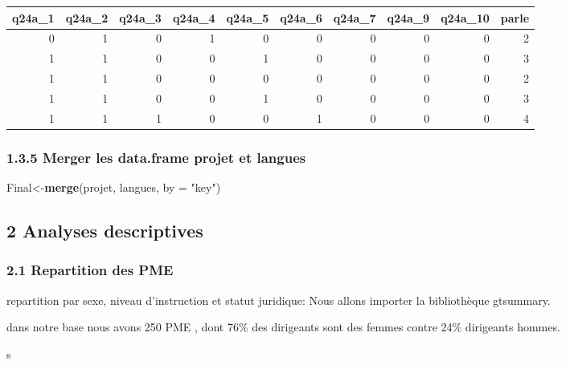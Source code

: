 \documentclass[
]{article}
\newenvironment{Shaded}{\begin{snugshade}}{\end{snugshade}}
\newcommand{\AttributeTok}[1]{\textcolor[rgb]{0.13,0.29,0.53}{#1}}
\newcommand{\FunctionTok}[1]{\textcolor[rgb]{0.13,0.29,0.53}{\textbf{#1}}}
\newcommand{\NormalTok}[1]{#1}
\newcommand{\OtherTok}[1]{\textcolor[rgb]{0.56,0.35,0.01}{#1}}
\newcommand{\StringTok}[1]{\textcolor[rgb]{0.31,0.60,0.02}{#1}}
\begin{document}
\begin{tabular}{r|r|r|r|r|r|r|r|r|r}
\hline
q24a\_1 & q24a\_2 & q24a\_3 & q24a\_4 & q24a\_5 & q24a\_6 & q24a\_7 & q24a\_9 & q24a\_10 & parle\\
\hline
0 & 1 & 0 & 1 & 0 & 0 & 0 & 0 & 0 & 2\\
\hline
1 & 1 & 0 & 0 & 1 & 0 & 0 & 0 & 0 & 3\\
\hline
1 & 1 & 0 & 0 & 0 & 0 & 0 & 0 & 0 & 2\\
\hline
1 & 1 & 0 & 0 & 1 & 0 & 0 & 0 & 0 & 3\\
\hline
1 & 1 & 1 & 0 & 0 & 1 & 0 & 0 & 0 & 4\\
\hline
\end{tabular}

\hypertarget{merger-les-data.frame-projet-et-langues}{%
\subsubsection{1.3.5 Merger les data.frame projet et
langues}\label{merger-les-data.frame-projet-et-langues}}

\begin{Shaded}
\begin{Highlighting}[]
\NormalTok{Final}\OtherTok{\textless{}{-}}\FunctionTok{merge}\NormalTok{(projet, langues, }\AttributeTok{by =} \StringTok{"key"}\NormalTok{)}
\end{Highlighting}
\end{Shaded}

\hypertarget{analyses-descriptives}{%
\subsection{2 Analyses descriptives}\label{analyses-descriptives}}

\hypertarget{repartition-des-pme}{%
\subsubsection{2.1 Repartition des PME}\label{repartition-des-pme}}

repartition par sexe, niveau d'instruction et statut juridique: Nous
allons importer la bibliothèque gtsummary.

dans notre base nous avons 250 PME , dont 76\% des dirigeants sont des
femmes contre 24\% dirigeants hommes.

s
\end{document}
